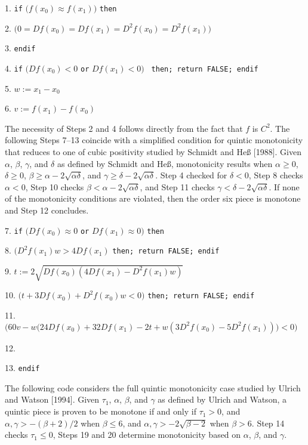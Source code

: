 {\parindent=6mm
\item{1.} {\tt if} $\bigl(f(x_0) \approx f(x_1)\bigr)$ {\tt then}
\item{2.}  $\bigl( 0 = Df(x_0) = Df(x_1)
  = D^2f(x_0) = D^2f(x_1) \bigr)$
\item{3.} {\tt endif}
\item{4.} {\tt if} $\bigl(Df(x_0) < 0$ {\tt or} $Df(x_1) < 0\bigr)$ {\tt
  then; return FALSE; endif}
\item{5.} $w := x_1 - x_0$
\item{6.} $v := f(x_1) - f(x_0)$

\item{} {The necessity of Steps 2 and 4 follows directly from
  the fact that $f$ is $C^2$. The following Steps 7--13 coincide with
  a simplified condition for quintic monotonicity that reduces to one
  of cubic positivity studied by Schmidt and He{\ss} [1988]. Given
  $\alpha$, $\beta$, $\gamma$, and $\delta$ as defined by Schmidt and
  He{\ss}, monotonicity results when $\alpha \geq 0$, $\delta \geq 0$,
  $\beta \geq \alpha - 2 \sqrt{\alpha \delta}$, and $\gamma \geq
  \delta - 2 \sqrt{\alpha \delta}$.  Step 4 checked for $\delta < 0$,
  Step 8 checks $\alpha < 0$, Step 10 checks $\beta < \alpha - 2
  \sqrt{\alpha \delta}$, and Step 11 checks $\gamma < \delta - 2
  \sqrt{\alpha \delta}$. If none of the monotonicity conditions are
  violated, then the order six piece is monotone and Step 12
  concludes.}

\item{7.} {\tt if} $\bigl(Df(x_0) \approx 0$ {\tt or} $Df(x_1) \approx
0\bigr)$ {\tt then}
\item{8.}  $\bigl(D^2f(x_1)w > 4Df(x_1)$ {\tt then;
return FALSE; endif}
\item{9.} \codent $t := 2 \sqrt{Df(x_0) (4Df(x_1) - D^2f(x_1) w) }$
\item{10.}  $\bigl(t + 3Df(x_0) + D^2f(x_0)w < 0 \bigr)$
  {\tt then; return FALSE; endif}
\item{11.}  $\bigl(60v - w\bigl(24Df(x_0) + 32Df(x_1) - 2t
  + w(3D^2f(x_0) - 5D^2f(x_1))\bigr) < 0\bigr)$
\item{}   \codent {}
\item{12.} 
\item{13.} {\tt endif}

\item{} {The following code considers the full quintic monotonicity
case studied by Ulrich and Watson [1994]. Given $\tau_1$, $\alpha$,
$\beta$, and $\gamma$ as defined by Ulrich and Watson, a quintic
piece is proven to be monotone if and only if
$\tau_1 > 0$, and $\alpha, \gamma > -(\beta+2)/2$ when $\beta \leq 6$,
and $\alpha, \gamma > -2 \sqrt{\beta-2}$ when $\beta > 6$.
Step 14 checks $\tau_1 \le 0$, Steps 19 and 20 determine monotonicity based
on $\alpha$, $\beta$, and $\gamma$.}

}
